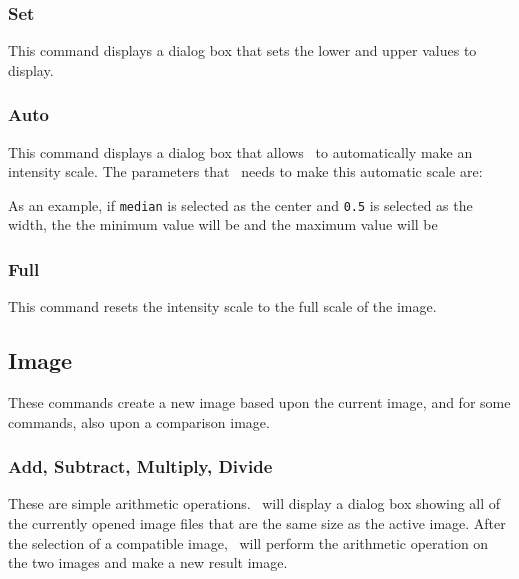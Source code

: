 \subsubsection{Set}\label{IDH_DLG_MINMAX}
This command displays a dialog box that sets the lower
and upper values to display.

\subsubsection{Auto}\label{IDH_DLG_AUTOSCALE}
This command displays a dialog box that allows \ctsim\ to automatically
make an intensity scale. The parameters that \ctsim\ needs to make this
automatic scale are:

\begin{twocollist}

\end{twocollist}

As an example, if \texttt{median} is selected as the center and
\texttt{0.5} is selected as the width, the the minimum value will
be 
and the maximum value will be 

\subsubsection{Full}
This command resets the intensity scale to the full scale of the image.

\subsection{Image}
These commands create a new image based upon the current image,
and for some commands, also upon a comparison image.

\subsubsection{Add, Subtract, Multiply, Divide}
These are simple arithmetic operations. \ctsim\ will display a dialog
box showing all of the currently opened image files that are the
same size as the active image. After the selection of a compatible image,
\ctsim\ will perform the arithmetic operation on the two images and
make a new result image.

